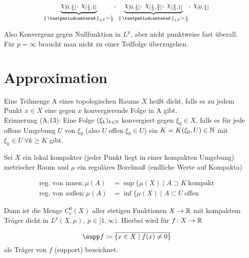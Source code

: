 \documentclass[skript.tex]{subfiles}
\begin{document}
\begin{bsp}[Raumschiff]
	\begin{equation*}
	\underbrace{\chi_{[0,\frac{1}{2}]}, \: \chi_{[\frac{1}{2},1]}}_{\norm{·}_{L^p}=\frac{1}{2}}, \: \underbrace{\chi_{[0,\frac{1}{3}]}, \: \chi_{[\frac{1}{3},\frac{2}{3}]}, \: \chi_{[\frac{2}{3},1]}}_{\norm{·}_{L^p}=\frac{1}{3}}, \: \chi_{[0,\frac{1}{4}]}
	\end{equation*}
	
	Also Konvergenz gegen Nullfunktion in $L^p$, aber nicht punktweise fast überall. Für $p= \infty$ braucht man nicht zu einer Teilfolge überzugehen.
\end{bsp}

\section{Approximation}

\begin{defin}
	Eine Teilmenge A eines topologischen Raums $X$ heißt dicht, falls es zu jedem Punkt $x\in X$ eine gegen $x$ konvergierende Folge in A gibt. \\
	Erinnerung (A.13): Eine Folge $(\xi_k)_{k\in\mathbb{N}}$ konvergiert gegen $\xi_0 \in X$, falls es für jede offene Umgebung $U$ von $\xi_0$ (also $U$ offen $\xi_0 \in U$) ein $K = K(\xi_0,U) \in \mathbb{N}$ mit $\xi_k \in U \: \forall k \geq K$ gibt.
\end{defin}

\begin{theorem}
	Sei $X$ ein lokal kompakter (jeder Punkt liegt in einer kompakten Umgebung) metrischer Raum und $\mu$ ein reguläres Borelmaß (endliche Werte auf Kompakta)
	
	\begin{align*}
    \text{reg. von innen} \colon \mu(A) &= \sup\{\mu(X) \mid A \supset K \: \text{kompakt} \\
    \text{reg. von außen} \colon \mu(A) &= \inf\{\mu(X) \mid A \subset U \: \text{offen}
	\end{align*}
	
	Dann ist die Menge $C_c^0(X)$ aller stetigen Funktionen $X \to \mathbb{R}$ mit kompaktem Träger dicht in $L^p(X,\mu), \: p\in [1, \infty)$. Hierbei wird für $f \colon X \to \mathbb{R}$ 
	
	\begin{equation*}
	\supp f \ceq  \overline{\{x\in X \mid f(x) \neq0 \}}
	\end{equation*}
	als Träger von $f$ (support) bezeichnet.
\end{theorem}
\end{document}
